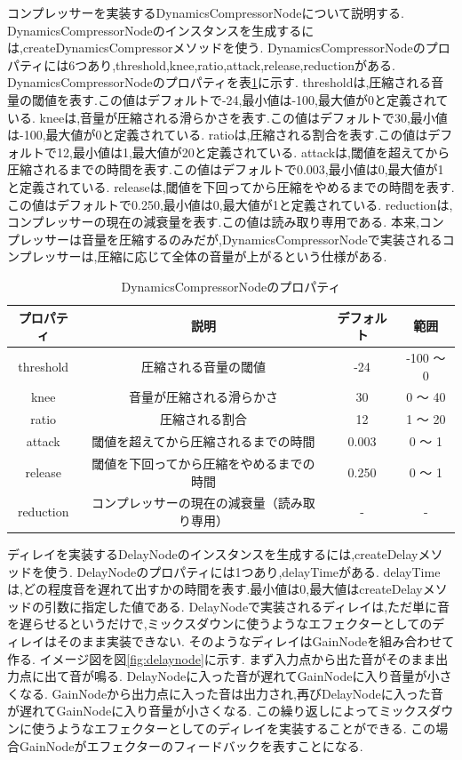 \documentclass[12pt,a4j,titlepage]{ltjsarticle}
\begin{document}
コンプレッサーを実装するDynamicsCompressorNodeについて説明する.
DynamicsCompressorNodeのインスタンスを生成するには,createDynamicsCompressorメソッドを使う.
DynamicsCompressorNodeのプロパティには6つあり,threshold,knee,ratio,attack,release,reductionがある.
DynamicsCompressorNodeのプロパティを表\ref{table:DynamicsCompressorNode}に示す.
thresholdは,圧縮される音量の閾値を表す.この値はデフォルトで-24,最小値は-100,最大値が0と定義されている.
kneeは,音量が圧縮される滑らかさを表す.この値はデフォルトで30,最小値は-100,最大値が0と定義されている.
ratioは,圧縮される割合を表す.この値はデフォルトで12,最小値は1,最大値が20と定義されている.
attackは,閾値を超えてから圧縮されるまでの時間を表す.この値はデフォルトで0.003,最小値は0,最大値が1と定義されている.
releaseは,閾値を下回ってから圧縮をやめるまでの時間を表す.この値はデフォルトで0.250,最小値は0,最大値が1と定義されている.
reductionは,コンプレッサーの現在の減衰量を表す.この値は読み取り専用である.
本来,コンプレッサーは音量を圧縮するのみだが,DynamicsCompressorNodeで実装されるコンプレッサーは,圧縮に応じて全体の音量が上がるという仕様がある.

\begin{table}[h]
  \centering
  \caption{DynamicsCompressorNodeのプロパティ}
  \label{table:DynamicsCompressorNode}
  \small
  \begin{tabular}{cccc}
    \hline
    プロパティ  & 説明 & デフォルト & 範囲    \\
    \hline \hline
    threshold  & 圧縮される音量の閾値 & -24 & -100 ～ 0\\
    \hline
    knee  & 音量が圧縮される滑らかさ & 30 & 0 ～ 40\\
    \hline
    ratio  &  圧縮される割合 & 12 & 1 ～ 20\\
    \hline
    attack  &  閾値を超えてから圧縮されるまでの時間 & 0.003 & 0 ～ 1\\
    \hline
    release  &  閾値を下回ってから圧縮をやめるまでの時間 & 0.250 & 0 ～ 1\\
    \hline
    reduction  &  コンプレッサーの現在の減衰量（読み取り専用） & - & -\\
    \hline
  \end{tabular}
\end{table}

ディレイを実装するDelayNodeのインスタンスを生成するには,createDelayメソッドを使う.
DelayNodeのプロパティには1つあり,delayTimeがある.
delayTimeは,どの程度音を遅れて出すかの時間を表す.最小値は0,最大値はcreateDelayメソッドの引数に指定した値である.
DelayNodeで実装されるディレイは,ただ単に音を遅らせるというだけで,ミックスダウンに使うようなエフェクターとしてのディレイはそのまま実装できない.
そのようなディレイはGainNodeを組み合わせて作る.
イメージ図を図\ref{fig:delaynode}に示す.
まず入力点から出た音がそのまま出力点に出て音が鳴る.
DelayNodeに入った音が遅れてGainNodeに入り音量が小さくなる.
GainNodeから出力点に入った音は出力され,再びDelayNodeに入った音が遅れてGainNodeに入り音量が小さくなる.
この繰り返しによってミックスダウンに使うようなエフェクターとしてのディレイを実装することができる.
この場合GainNodeがエフェクターのフィードバックを表すことになる.
\end{document}
